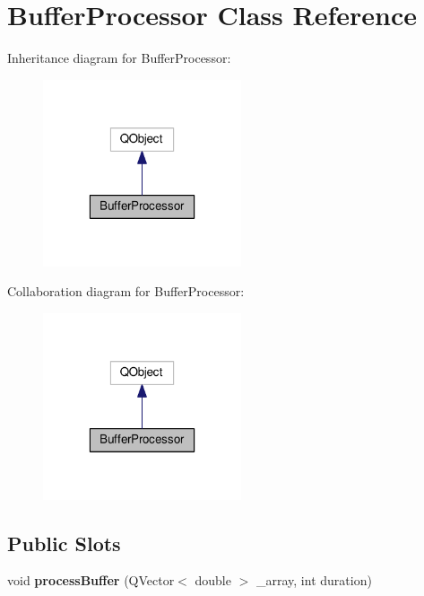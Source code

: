 \hypertarget{class_buffer_processor}{\section{Buffer\-Processor Class Reference}
\label{class_buffer_processor}
}


Inheritance diagram for Buffer\-Processor\-:
\nopagebreak
\begin{figure}[H]
\begin{center}
\leavevmode
\includegraphics[width=166pt]{class_buffer_processor__inherit__graph}
\end{center}
\end{figure}


Collaboration diagram for Buffer\-Processor\-:
\nopagebreak
\begin{figure}[H]
\begin{center}
\leavevmode
\includegraphics[width=166pt]{class_buffer_processor__coll__graph}
\end{center}
\end{figure}
\subsection*{Public Slots}
\begin{DoxyCompactItemize}
\item 
\hypertarget{class_buffer_processor_a19fedc34939ba4579b9a9bc3c53b7503}{void {\bfseries process\-Buffer} (Q\-Vector$<$ double $>$ \-\_\-array, int duration)}\label{class_buffer_processor_a19fedc34939ba4579b9a9bc3c53b7503}

\end{DoxyCompactItemize}
